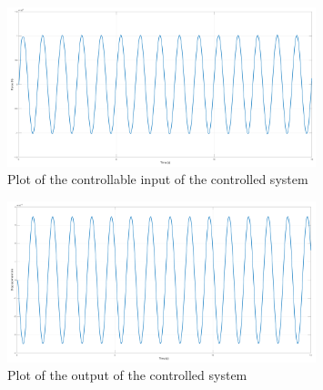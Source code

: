 \begin{figure}[H]
    \centering
    \includegraphics[width=0.8\textwidth]{resources/pdf/controllable-input.pdf}
    \caption{Plot of the controllable input of the controlled system}
    \label{fig:controllable-input}
\end{figure}
\begin{figure}[H]
    \centering
    \includegraphics[width=0.8\textwidth]{resources/pdf/output.pdf}
    \caption{Plot of the output of the controlled system}
    \label{fig:output}
\end{figure}
